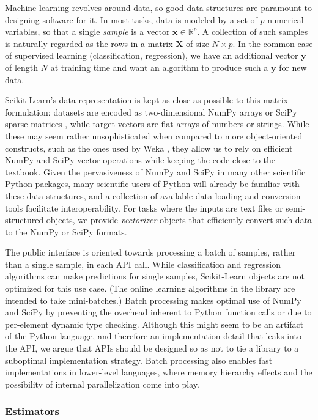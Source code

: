 Machine learning revolves around data, so good data structures are paramount to
designing software for it. In most tasks, data is modeled by a set of $p$
numerical variables, so that a single \textit{sample} is a vector $\mathbf{x}
\in \mathbb{R}^p$. A collection of such samples is naturally regarded as the
rows in a matrix $\mathbf{X}$ of size $N \times p$. In the common case of
supervised learning (classification, regression), we have an additional vector
$\mathbf{y}$ of length $N$ at training time and want an algorithm to produce
such a $\mathbf{y}$ for new data.

Scikit-Learn's data representation is kept as close as possible to this matrix
formulation: datasets are encoded as two-dimensional NumPy arrays or SciPy
sparse matrices \citep{vanderwalt:2011}, while target vectors are flat
arrays of numbers or strings. While these may seem rather unsophisticated when
compared to more object-oriented constructs, such as the ones used by Weka
\citep{hall:2009}, they allow us to rely on efficient NumPy and SciPy vector
operations while keeping the code close to the textbook. Given the
pervasiveness of NumPy and SciPy in many other scientific Python packages, many
scientific users of Python will already be familiar with these data structures,
and a collection of available data loading and conversion tools facilitate
interoperability. For tasks where the inputs are text files or semi-structured
objects, we provide \textit{vectorizer} objects that efficiently convert such
data to the NumPy or SciPy formats.

The public interface is oriented towards processing a batch of samples, rather
than a single sample, in each API call. While classification and regression
algorithms can make predictions for single samples, Scikit-Learn objects are
not optimized for this use case. (The online learning algorithms in the library
are intended to take mini-batches.) Batch processing makes optimal use of NumPy
and SciPy by preventing the overhead inherent to Python function calls or due
to per-element dynamic type checking. Although this might seem to be an
artifact of the Python language, and therefore an implementation detail that
leaks into the API, we argue that APIs should be designed so as not to tie a
library to a suboptimal implementation strategy. Batch processing also enables
fast implementations in lower-level languages, where memory hierarchy effects
and the possibility of internal parallelization come into play.

\subsubsection{Estimators}

